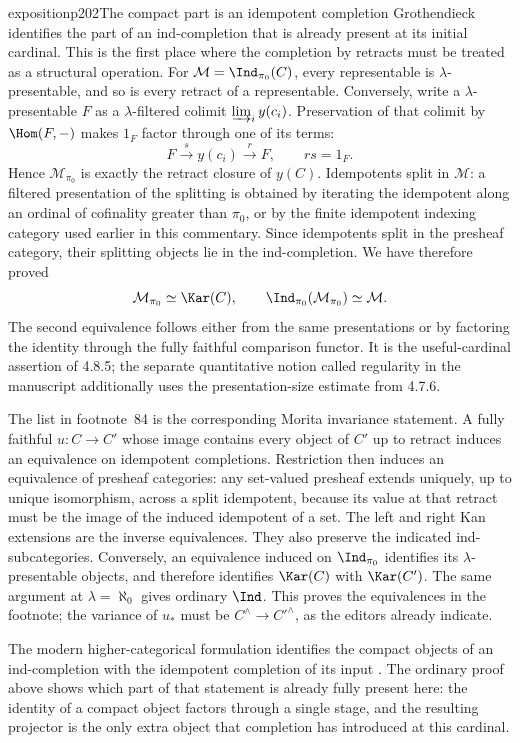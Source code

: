 \begin{dcomment}{exposition}{p202}{The compact part is an idempotent completion}
Grothendieck identifies the part of an ind-completion that is already present at its initial cardinal. This is the first place where the completion by retracts must be treated as a structural operation. For $\mathcal M=\Ind_{\pi_0}(C)$, every representable is $\lambda$-presentable, and so is every retract of a representable. Conversely, write a $\lambda$-presentable $F$ as a $\lambda$-filtered colimit $\varinjlim_i y(c_i)$. Preservation of that colimit by $\Hom(F,-)$ makes $1_F$ factor through one of its terms:
\[
 F\xrightarrow{s}y(c_i)\xrightarrow{r}F,
 \qquad rs=1_F.
\]
Hence $\mathcal M_{\pi_0}$ is exactly the retract closure of $y(C)$. Idempotents split in $\mathcal M$: a filtered presentation of the splitting is obtained by iterating the idempotent along an ordinal of cofinality greater than $\pi_0$, or by the finite idempotent indexing category used earlier in this commentary. Since idempotents split in the presheaf category, their splitting objects lie in the ind-completion. We have therefore proved
\[
 \mathcal M_{\pi_0}\simeq\Kar(C),\qquad
 \Ind_{\pi_0}(\mathcal M_{\pi_0})\simeq\mathcal M.
\]
The second equivalence follows either from the same presentations or by factoring the identity through the fully faithful comparison functor. It is the useful-cardinal assertion of 4.8.5; the separate quantitative notion called regularity in the manuscript additionally uses the presentation-size estimate from 4.7.6.

The list in footnote~84 is the corresponding Morita invariance statement. A fully faithful $u:C\to C'$ whose image contains every object of $C'$ up to retract induces an equivalence on idempotent completions. Restriction then induces an equivalence of presheaf categories: any set-valued presheaf extends uniquely, up to unique isomorphism, across a split idempotent, because its value at that retract must be the image of the induced idempotent of a set. The left and right Kan extensions are the inverse equivalences. They also preserve the indicated ind-subcategories. Conversely, an equivalence induced on $\Ind_{\pi_0}$ identifies its $\lambda$-presentable objects, and therefore identifies $\Kar(C)$ with $\Kar(C')$. The same argument at $\lambda=\aleph_0$ gives ordinary $\Ind$. This proves the equivalences in the footnote; the variance of $u_*$ must be $C^\wedge\to C'^\wedge$, as the editors already indicate.

The modern higher-categorical formulation identifies the compact objects of an ind-completion with the idempotent completion of its input \citep[Lemma~5.4.2.4]{Lurie2009HTT}. The ordinary proof above shows which part of that statement is already fully present here: the identity of a compact object factors through a single stage, and the resulting projector is the only extra object that completion has introduced at this cardinal.
\end{dcomment}

